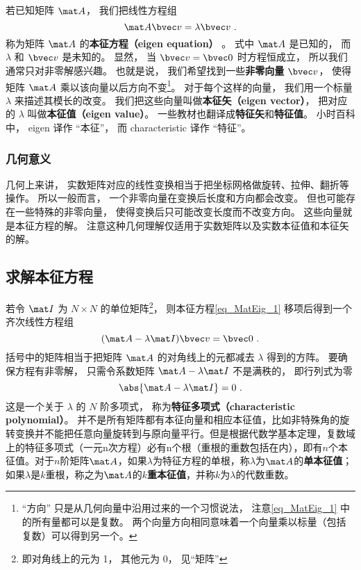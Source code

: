 

若已知矩阵 $\mat A$， 我们把线性方程组
\begin{equation}\label{eq_MatEig_1}
\mat A \bvec v = \lambda \bvec v~.
\end{equation}
称为矩阵 $\mat A$ 的\textbf{本征方程（eigen equation） }。 式中 $\mat A$ 是已知的， 而 $\lambda$ 和 $\bvec v$ 是未知的。 显然， 当 $\bvec v = \bvec 0$ 时方程恒成立， 所以我们通常只对非零解感兴趣。 也就是说， 我们希望找到一些\textbf{非零向量} $\bvec v$， 使得矩阵 $\mat A$ 乘以该向量以后方向不变\footnote{“方向” 只是从几何向量中沿用过来的一个习惯说法， 注意\autoref{eq_MatEig_1} 中的所有量都可以是复数。 两个向量方向相同意味着一个向量乘以标量（包括复数）可以得到另一个。}。 对于每个这样的向量， 我们用一个标量 $\lambda$ 来描述其模长的改变。 我们把这些向量叫做\textbf{本征矢（eigen vector）}， 把对应的 $\lambda$ 叫做\textbf{本征值（eigen value）}。 一些教材也翻译成\textbf{特征矢}和\textbf{特征值}。 小时百科中， eigen 译作 “本征”， 而 characteristic 译作 “特征”。

\subsubsection{几何意义}
几何上来讲， 实数矩阵对应的线性变换相当于把坐标网格做旋转、拉伸、翻折等操作。%
所以一般而言， 一个非零向量在变换后长度和方向都会改变。 但也可能存在一些特殊的非零向量， 使得变换后只可能改变长度而不改变方向。 这些向量就是本征方程的解。 注意这种几何理解仅适用于实数矩阵以及实数本征值和本征矢的解。

\subsection{求解本征方程}\label{sub_MatEig_1}

若令 $\mat I$ 为 $N\times N$ 的单位矩阵\footnote{即对角线上的元为 1， 其他元为 0， 见“矩阵”}， 则本征方程\autoref{eq_MatEig_1} 移项后得到一个齐次线性方程组
\begin{equation}\label{eq_MatEig_2}
(\mat A - \lambda\mat I)\bvec v = \bvec 0~.
\end{equation}
括号中的矩阵相当于把矩阵 $\mat A$ 的对角线上的元都减去 $\lambda$ 得到的方阵。 要确保方程有非零解， 只需令系数矩阵 $\mat A - \lambda\mat I$ 不是满秩的， 即行列式为零
\begin{equation}\label{eq_MatEig_4}
\abs{\mat A - \lambda\mat I} = 0~.
\end{equation}
这是一个关于 $\lambda$ 的 $N$ 阶多项式， 称为\textbf{特征多项式（characteristic polynomial）}。 并不是所有矩阵都有本征向量和相应本征值，比如非特殊角的旋转变换并不能把任意向量旋转到与原向量平行。但是根据代数学基本定理，复数域上的特征多项式（一元n次方程）必有n个根（重根的重数包括在内），即有$n$个本征值。对于$n$阶矩阵$\mat A$，如果$\lambda$为特征方程的单根，称$\lambda$为$\mat A$的\textbf{单本征值}；如果$\lambda$是$k$重根，称之为$\mat A$的\textbf{$k$重本征值}，并称$k$为$\lambda$的代数重数。


